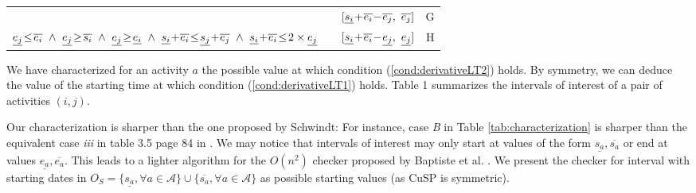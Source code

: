 \documentclass{llncs}
\begin{document}
{\begin{table}[!ht]
\begin{minipage}{\textwidth}
\begin{tabular}{|lll|r|}
&&$[  \underline{s_i} \!+\! \overline{e_i} \!-\! \overline{e_j} , ~  \overline{e_j}]$ &G\\
\scriptsize
$\underline{e_j} \myLe \overline{e_i}\myWedge
\underline{e_j} \myGe \overline{s_i}\myWedge
\underline{e_j}  \myGe \underline{e_i}\myWedge
\underline{s_i} \myPlus \overline{e_i}  \myLe \underline{s_j} \myPlus \overline{e_j} \myWedge 
\underline{s_i} \myPlus \overline{e_i}  \myLe 2\times \underline{e_j}$
&&$[  \underline{s_i} \!+\! \overline{e_i} \!-\! \underline{e_j} , ~  \underline{e_j}]$ &H\\ \hline
\end{tabular}
\end{minipage}
\vspace{-0.7cm}
\end{table}
}




 We have characterized for an activity $a$ the possible value at which condition (\ref{cond:derivativeLT2}) holds. By symmetry, we can deduce the value of the starting time at which condition (\ref{cond:derivativeLT1}) holds.
Table 1 summarizes the intervals of interest of a pair of activities $(i, j)$. 

Our characterization is sharper than the one proposed by Schwindt: For instance, case \emph{B} in Table \ref{tab:characterization} is sharper than the 
equivalent case \emph{iii} in table 3.5 page 84 in \cite{schwindt98:PhD}.
We may notice that intervals of interest may only start at values of the form $\underline{s_a}, \overline{s_a}$ or end at values $\underline{e_a}, \overline{e_a}$.
This leads to a  lighter algorithm for the $O(n^2)$ checker proposed by Baptiste et al. \cite{baptiste:inria-00123562}.
We present the checker for interval with starting dates in $O_S = \{\underline{s_a}, \forall a \in\mathcal{A}\}   \! \cup\!   \{\overline{s_a}, \forall a \in\mathcal{A}\}$  as possible starting values (as CuSP is symmetric).
\end{document}
